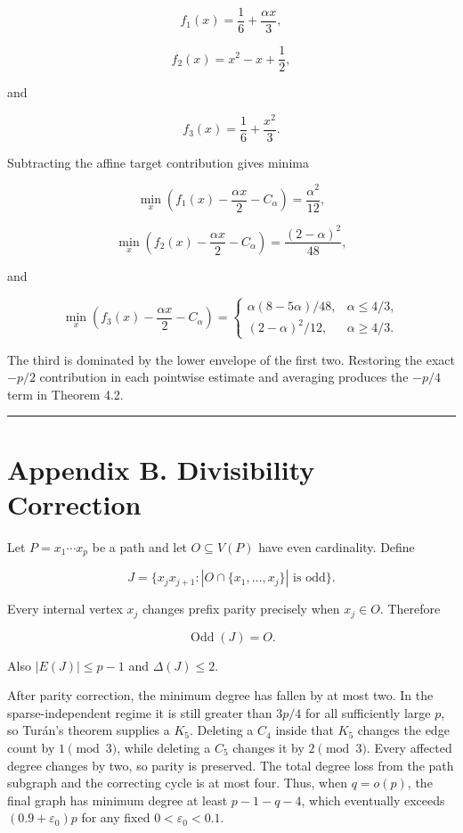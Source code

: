\documentclass[english,11pt,a4paper]{article}
\begin{document}
\[
f_1(x)=\frac16+\frac{\alpha x}{3},
\]

\[
f_2(x)=x^2-x+\frac12,
\]

and

\[
f_3(x)=\frac16+\frac{x^2}{3}.
\]

Subtracting the affine target contribution gives minima

\[
\min_x\left(f_1(x)-\frac{\alpha x}{2}-C_\alpha\right)
=
\frac{\alpha^2}{12},
\]

\[
\min_x\left(f_2(x)-\frac{\alpha x}{2}-C_\alpha\right)
=
\frac{(2-\alpha)^2}{48},
\]

and

\[
\min_x\left(f_3(x)-\frac{\alpha x}{2}-C_\alpha\right)
=
\begin{cases}
\alpha(8-5\alpha)/48,&\alpha\le4/3,\\
(2-\alpha)^2/12,&\alpha\ge4/3.
\end{cases}
\]

The third is dominated by the lower envelope of the first two. Restoring
the exact \(-p/2\) contribution in each pointwise estimate and averaging
produces the \(-p/4\) term in Theorem 4.2.

\begin{center}\rule{0.5\linewidth}{0.5pt}\end{center}

\section{Appendix B. Divisibility
Correction}\label{appendix-b.-divisibility-correction}

Let \(P=x_1\cdots x_p\) be a path and let \(O\subseteq V(P)\) have even
cardinality. Define

\[
J=\{x_jx_{j+1}:|O\cap\{x_1,\ldots,x_j\}|\text{ is odd}\}.
\]

Every internal vertex \(x_j\) changes prefix parity precisely when
\(x_j\in O\). Therefore

\[
\operatorname{Odd}(J)=O.
\]

Also \(|E(J)|\le p-1\) and \(\Delta(J)\le2\).

After parity correction, the minimum degree has fallen by at most two.
In the sparse-independent regime it is still greater than \(3p/4\) for
all sufficiently large \(p\), so Turán's theorem supplies a \(K_5\).
Deleting a \(C_4\) inside that \(K_5\) changes the edge count by
\(1\pmod3\), while deleting a \(C_5\) changes it by \(2\pmod3\). Every
affected degree changes by two, so parity is preserved. The total degree
loss from the path subgraph and the correcting cycle is at most four.
Thus, when \(q=o(p)\), the final graph has minimum degree at least
\(p-1-q-4\), which eventually exceeds \((0.9+\varepsilon_0)p\) for any
fixed \(0<\varepsilon_0<0.1\).
\end{document}
